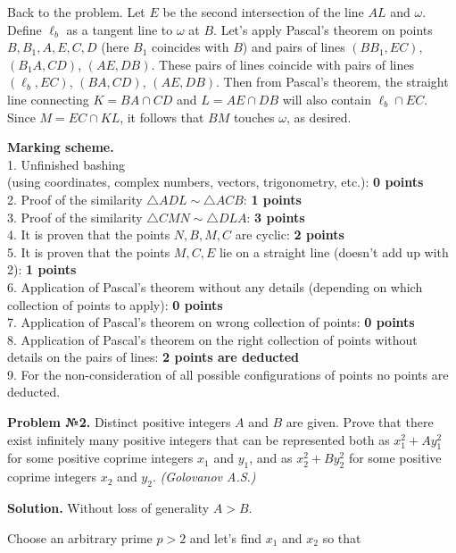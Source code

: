 \documentclass[12pt]{article}
\newcounter{problem}
\def \Problem#1{\par \bigskip \textbf{Problem №{#1}. }}
\def \solution{\par \bigskip \textbf{Solution. }}
\def \marking{\par \bigskip \textbf{Marking scheme. }}
\begin{document}
Back to the problem. Let $E$ be the second intersection of the line $AL$ and $\omega.$ Define $\ell_b$ as a tangent line to $\omega$ at $B$. Let's apply Pascal's theorem on points $B, B_1, A, E, C, D$ (here $B_1$ coincides with $B$) and pairs of lines $(BB_1, EC)$, $(B_1A, CD)$, $(AE, DB).$ These pairs of lines coincide with pairs of lines $(\ell_b, EC)$, $(BA, CD)$, $(AE, DB)$. Then from Pascal's theorem, the straight line connecting $K = BA \cap CD$ and $L = AE \cap DB$ will also contain $\ell_b \cap EC$. Since $M = EC \cap KL$, it follows that $BM$ touches $\omega$, as desired.

\marking
\\ 1. Unfinished bashing \\(using coordinates, complex numbers, vectors, trigonometry, etc.): 
\dotfill \textbf{0 points}
\\ 2. Proof of the similarity $\triangle ADL \sim \triangle ACB$: \dotfill \textbf{1 points}
\\ 3. Proof of the similarity $\triangle CMN \sim \triangle DLA$: \dotfill \textbf{3 points}
\\ 4. It is proven that the points $N, B, M, C$ are cyclic: \dotfill \textbf{2 points}
\\ 5. It is proven that the points $M, C, E$ lie on a straight line (doesn't add up with 2): \dotfill \textbf{1 points}
\\ 6. Application of Pascal's theorem without any details (depending on which collection of points to apply): \dotfill \textbf{0 points}
\\ 7. Application of Pascal's theorem on wrong collection of points: \dotfill \textbf{0 points}
\\ 8. Application of Pascal's theorem on the right collection of points without details on the pairs of lines: \dotfill \textbf{2 points are deducted}
\\ 9. For the non-consideration of all possible configurations of points no points are deducted.

\newpage
\Problem{2} Distinct positive integers $A$ and $B$ are given. Prove that there exist infinitely many positive integers that can be represented both as $x_1^2 + Ay_1^2$ for some positive coprime integers $x_1$ and $y_1$, and as $x_2^2 + By_2^2$ for some positive coprime integers $x_2$ and $y_2$.
\textit{(Golovanov A.S.)}

\solution Without loss of generality $A > B$.

Choose an arbitrary prime $p > 2$ and let's find $x_1$ and $x_2$ so that 
\end{document}
